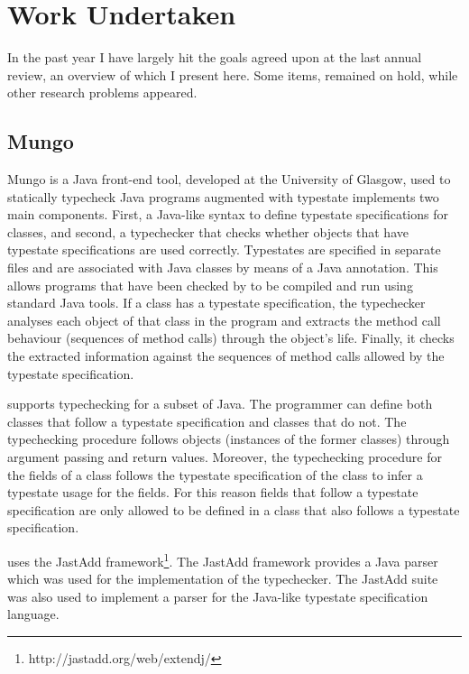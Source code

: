 \section{Work Undertaken}
\label{Research}

In the past year I have largely hit the goals agreed upon at the
last annual review, an overview of which I present here. Some items, remained on hold, while other research problems appeared.

\subsection{Mungo}
\label{sub:Mungo}


Mungo\cite{kouzapas16} is a Java front-end tool, developed at the University of Glasgow, used to statically typecheck Java programs augmented with typestate
\Mungo implements two main components. First, a Java-like syntax to define
typestate specifications for classes, and second, a typechecker
that checks whether objects that have typestate specifications are used correctly. Typestates are specified in separate files and
are associated with Java classes by means of a Java
annotation. This allows programs that have been
checked by \Mungo to be compiled and run using standard
Java tools. If a class has a typestate specification, the \Mungo typechecker analyses each object of that class in the program and extracts the
method call behaviour (sequences of method calls) through the object's life. Finally, it checks the extracted information against
the sequences of method calls allowed by the typestate specification.



\Mungo supports typechecking for a subset of Java.
The programmer can define both classes that follow
a typestate specification and classes that do not.
The typechecking procedure follows objects (instances
of the former classes) through argument passing and
return values. Moreover, the typechecking procedure
for the fields of a class follows the typestate
specification of the class to infer a typestate
usage for the fields. For this reason fields that
follow a typestate specification are only allowed to be defined
in a class that also follows a typestate specification.

\Mungo uses the JastAdd framework\footnote{http://jastadd.org/web/extendj/}\cite{jastadd}. The JastAdd framework provides a Java parser
which was used for the implementation of the \Mungo typechecker. The JastAdd suite was also used to implement a parser
for the Java-like typestate specification language.

